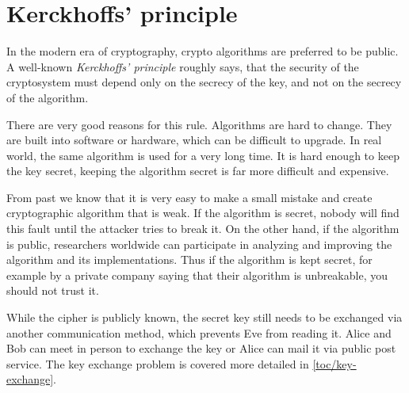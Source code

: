 \section{Kerckhoffs' principle}
\label{toc/kerckhoffs-principle}

In the modern era of cryptography, crypto algorithms are preferred to be public. A well-known \textit{Kerckhoffs' principle} roughly says, that the security of the cryptosystem must depend only on the secrecy of the key, and not on the secrecy of the algorithm.

There are very good reasons for this rule. Algorithms are hard to change. They are built into software or hardware, which can be difficult to upgrade. In real world, the same algorithm is used for a very long time. It is hard enough to keep the key secret, keeping the algorithm secret is far more difficult and expensive.

From past we know that it is very easy to make a small mistake and create cryptographic algorithm that is weak. If the algorithm is secret, nobody will find this fault until the attacker tries to break it. On the other hand, if the algorithm is public, researchers worldwide can participate in analyzing and improving the algorithm and its implementations. Thus if the algorithm is kept secret, for example by a private company saying that their algorithm is unbreakable, you should not trust it.

While the cipher is publicly known, the secret key still needs to be exchanged via another communication method, which prevents Eve from reading it. Alice and Bob can meet in person to exchange the key or Alice can mail it via public post service. The key exchange problem is covered more detailed in \autoref{toc/key-exchange}.
